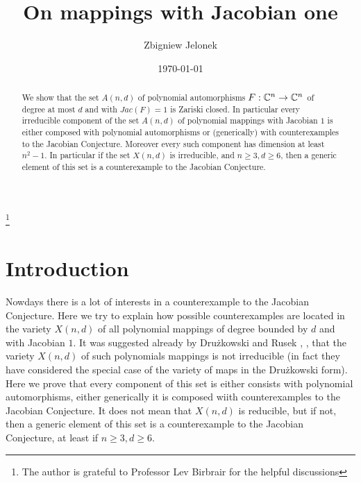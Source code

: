 \documentclass{amsart}
\begin{document}
\title[On mappings with Jacobian 1]{On mappings with Jacobian one}


\author[Z. Jelonek]{Zbigniew Jelonek}

\address[Zbigniew Jelonek]{ Instytut Matematyczny, Polska Akademia Nauk, \'Sniadeckich 8, 00-656 Warszawa, Poland      
\newline  
              E-mail: {\tt najelone@cyf-kr.edu.pl}
              }



\date{\today}

\thanks{The author is grateful to Professor Lev Birbrair for the helpful discussions}

\maketitle



\begin{abstract}
We show that the set $A(n, d)$ of polynomial automorphisms $F : \Bbb C^n \to \Bbb C^n$ of degree at most  $d$ and with $Jac(F ) = 1$ is Zariski closed.
In particular every irreducible component of the set $A(n,d)$ of polynomial mappings with Jacobian $1$ is either composed with polynomial automorphisms or 
(generically) with counterexamples to the Jacobian Conjecture. Moreover every such component has dimension at least $n^2-1.$ In particular
if the set $X(n,d)$ is irreducible, and $n\ge 3, d\ge 6$, then a generic element of this set is a counterexample to the Jacobian Conjecture.

\end{abstract}

\maketitle

\section{Introduction}
Nowdays there is a lot of interests in a counterexample to the Jacobian Conjecture. Here we try to explain 
 how possible counterexamples are located in the variety $X(n,d)$ of all polynomial mappings of degree bounded by $d$ and with Jacobian $1.$ It was suggested already by Dru\.zkowski and Rusek
 \cite{dr}, \cite{rus}, that the variety $X(n,d)$ of such polynomials mappings is not irreducible (in fact they have considered the special case of the variety of maps in the Dru\.zkowski
 form). Here we prove that every component of this set is either consists with polynomial automorphisms, either generically it is composed wiith  counterexamples 
to the Jacobian Conjecture. It does not mean that $X(n,d)$ is reducible, but if not, then a generic element of this set is a counterexample to the Jacobian Conjecture,
at least if $n\ge 3, d\ge 6.$
\end{document}
